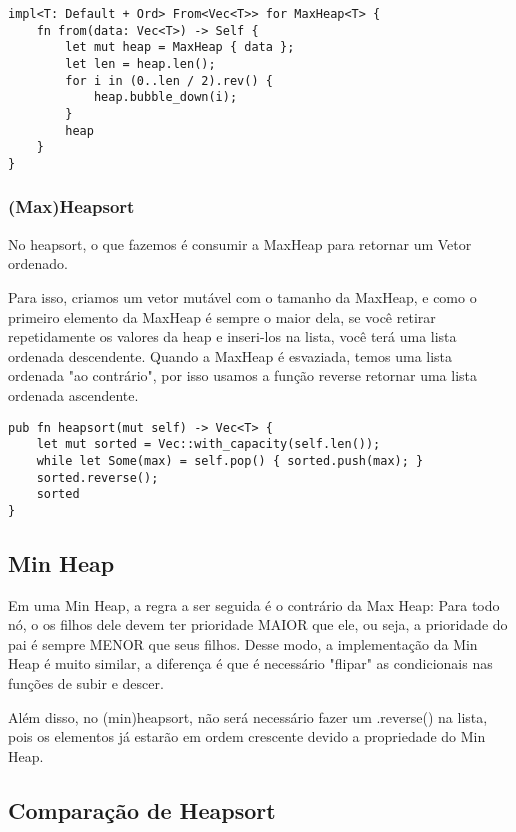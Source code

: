 \begin{lstlisting}
impl<T: Default + Ord> From<Vec<T>> for MaxHeap<T> {
    fn from(data: Vec<T>) -> Self {
        let mut heap = MaxHeap { data };
        let len = heap.len();
        for i in (0..len / 2).rev() {
            heap.bubble_down(i);
        }
        heap
    }
}
\end{lstlisting}

\subsubsection{(Max)Heapsort}

No heapsort, o que fazemos é consumir a MaxHeap para retornar um Vetor ordenado.

Para isso, criamos um vetor mutável com o tamanho da MaxHeap, e como o primeiro elemento
da MaxHeap é sempre o maior dela, se você retirar repetidamente os valores da heap e inseri-los na lista, você
terá uma lista ordenada descendente. Quando a MaxHeap é esvaziada, temos uma lista ordenada
"ao contrário", por isso usamos a função reverse retornar uma lista ordenada ascendente.

\begin{lstlisting}
pub fn heapsort(mut self) -> Vec<T> {
    let mut sorted = Vec::with_capacity(self.len());
    while let Some(max) = self.pop() { sorted.push(max); }
    sorted.reverse();
    sorted
}
\end{lstlisting}

\subsection{Min Heap}

Em uma Min Heap, a regra a ser seguida é o contrário da Max Heap: Para todo nó,
o os filhos dele devem ter prioridade MAIOR que ele, ou seja, a prioridade do pai
é sempre MENOR que seus filhos. 
Desse modo, a implementação da Min Heap
é muito similar, a diferença é que é necessário "flipar" as condicionais nas funções de subir
e descer. 

Além disso, no (min)heapsort, não será necessário fazer um .reverse() na lista, pois os elementos 
já estarão em ordem crescente devido a propriedade do Min Heap.

\subsection{Comparação de Heapsort}
